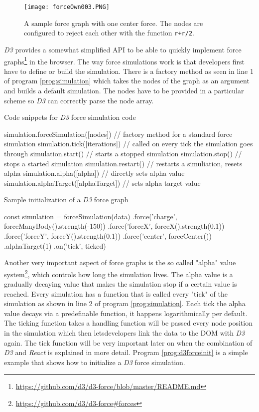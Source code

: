 \begin{figure}
  \centering
  \texttt{[image: forceOwn003.PNG]}
  \caption{A sample force graph with one center force. The nodes are configured to reject each other with the function \texttt{r+r/2}.}
  \label{fig:force004}
\end{figure}

\emph{D3} provides a somewhat simplified API to be able to quickly implement force graphs\footnote{\url{https://github.com/d3/d3-force/blob/master/README.md}} in the browser. The way force simulations work is that developers first have to define or build the simulation. There is a factory method as seen in line 1 of program \ref{prog:simulation} which takes the nodes of the graph as an argument and builds a default simulation. The nodes have to be provided in a particular scheme so \emph{D3} can correctly parse the node array. 

\begin{program}
\caption{Code snippets for \emph{D3} force simulation code}
\label{prog:simulation}
\begin{JsCode}
simulation.forceSimulation([nodes]) // factory method for a standard force simulation
simulation.tick([iterations]) // called on every tick the simulation goes through
simulation.start() // starts a stopped simulation
simulation.stop() // stops a started simulation
simulation.restart() // restarts a simuliation, resets alpha
simulation.alpha([alpha]) // directly sets alpha value
simulation.alphaTarget([alphaTarget]) // sets alpha target value
\end{JsCode}
\end{program}

\begin{program}
\caption{Sample initialization of a \emph{D3} force graph}
\label{prog:d3forceinit}
\begin{JsCode}
const simulation = forceSimulation(data)
  .force('charge', forceManyBody().strength(-150))
  .force('forceX', forceX().strength(0.1))
  .force('forceY', forceY().strength(0.1))
  .force('center', forceCenter())
  .alphaTarget(1)
  .on('tick', ticked)
\end{JsCode}
\end{program}

Another very important aspect of force graphs is the so called "alpha" value system\footnote{\url{https://github.com/d3/d3-force\#forces}}, which controls how long the simulation lives. The alpha value is a gradually decaying value that makes the simulation stop if a certain value is reached. Every simulation has a function that is called every "tick" of the simulation as shown in line 2 of program \ref{prog:simulation}. Each tick the alpha value decays via a predefinable function, it happens logarithmically per default. The ticking function takes a handling function will be passed every node position in the simulation which then letsdevelopers link the data to the DOM with \emph{D3} again. The tick function will be very important later on when the combination of \emph{D3} and \emph{React} is explained in more detail. Program \ref{prog:d3forceinit} is a simple example that shows how to initialize a \emph{D3} force simulation.

